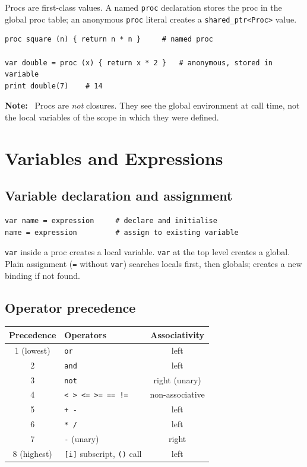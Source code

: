\documentclass[11pt,a4paper]{article}
\newcommand{\musil}[1]{\lstinline[style=musilinline]{#1}}
\newenvironment{note}{\begin{mdframed}[backgroundcolor=blue!6,linecolor=musilblue,linewidth=0.8pt]\textbf{Note:}\ }{\end{mdframed}}
\begin{document}
Procs are first-class values. A named \musil{proc} declaration stores the proc
in the global proc table; an anonymous \musil{proc} literal creates a
\texttt{shared\_ptr<Proc>} value.

\begin{lstlisting}
proc square (n) { return n * n }     # named proc

var double = proc (x) { return x * 2 }   # anonymous, stored in variable
print double(7)    # 14
\end{lstlisting}

\begin{note}
Procs are \emph{not} closures. They see the global environment at call time,
not the local variables of the scope in which they were defined.
\end{note}

\section{Variables and Expressions}
\label{sec:vars}

\subsection{Variable declaration and assignment}

\begin{lstlisting}
var name = expression     # declare and initialise
name = expression         # assign to existing variable
\end{lstlisting}

\musil{var} inside a proc creates a local variable. \musil{var} at the top level
creates a global. Plain assignment (\musil{=} without \musil{var}) searches locals
first, then globals; creates a new binding if not found.

\subsection{Operator precedence}

\begin{center}
\begin{tabular}{@{}clc@{}}
\toprule
\textbf{Precedence} & \textbf{Operators} & \textbf{Associativity} \\
\midrule
1 (lowest) & \texttt{or}  & left \\
2 & \texttt{and}          & left \\
3 & \texttt{not}          & right (unary) \\
4 & \texttt{< > <= >= == !=} & non-associative \\
5 & \texttt{+ -}          & left \\
6 & \texttt{* /}          & left \\
7 & \texttt{-} (unary)    & right \\
8 (highest) & \texttt{[i]} subscript, \texttt{()} call & left \\
\bottomrule
\end{tabular}
\end{center}
\end{document}
